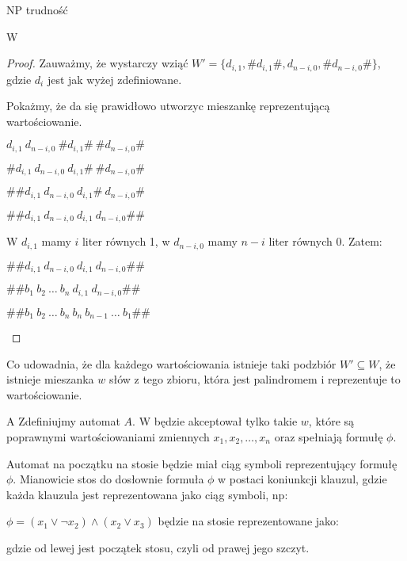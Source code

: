 \documentclass{article}
\theoremstyle{definition}
\theoremstyle{remark}
\begin{document}
\begin{section}{NP trudność}
\begin{subsection}{W}
\begin{proof}
Zauważmy, że wystarczy wziąć $W' = \{ d_{i,1}, \#d_{i,1}\#, d_{n-i, 0}, \# d_{n-i, 0} \# \}$, gdzie $d_i$ jest jak wyżej zdefiniowane.

Pokażmy, że da się prawidłowo utworzyc mieszankę reprezentującą wartościowanie.

\begin{center}
    $d_{i,1} \ d_{n-i, 0} \ \#d_{i,1}\# \ \# d_{n-i, 0} \#$
    
    $ \# d_{i,1} \ d_{n-i, 0} \ d_{i,1}\# \ \# d_{n-i, 0} \#$

    $ \# \# d_{i,1} \ d_{n-i, 0} \ d_{i,1}\# \ d_{n-i, 0} \#$

    $ \# \# d_{i,1} \ d_{n-i, 0} \ d_{i,1} \ d_{n-i, 0} \#\#$

\end{center}

W $d_{i,1}$ mamy $i$ liter równych 1, w $d_{n-i,0}$ mamy $n-i$ liter równych 0.
Zatem:
\begin{center}
    $ \# \# d_{i,1} \ d_{n-i, 0} \ d_{i,1} \ d_{n-i, 0} \#\#$

    $\# \# b_1 \ b_2 \ \ldots \ b_n \ d_{i,1} \ d_{n-i, 0} \#\#$

    $\# \# b_1 \ b_2 \ \ldots \ b_n \ b_n \ b_{n-1} \ \ldots \ b_1 \#\#$
\end{center}

\end{proof}

Co udowadnia, że dla każdego wartościowania istnieje taki podzbiór $W' \subseteq W$, że istnieje mieszanka $w$ słów z tego zbioru, która jest palindromem i reprezentuje to wartościowanie.

\end{subsection}

\begin{subsection}{A}
Zdefiniujmy automat $A$. W będzie akceptował tylko takie $w$, które są poprawnymi wartościowaniami zmiennych $x_1, x_2, \ldots, x_n$ 
oraz spełniają formułę $\phi$.

Automat na początku na stosie będzie miał ciąg symboli reprezentujący formułę $\phi$.
Mianowicie stos do dosłownie formuła $\phi$ w postaci koniunkcji klauzul, gdzie każda klauzula jest reprezentowana jako ciąg symboli, np:

$ \phi = (x_1 \lor \neg x_2) \land (x_2 \lor x_3)$ będzie na stosie reprezentowane jako:


gdzie od lewej jest początek stosu, czyli od prawej jego szczyt.
\end{subsection}

\end{section}
\end{document}
